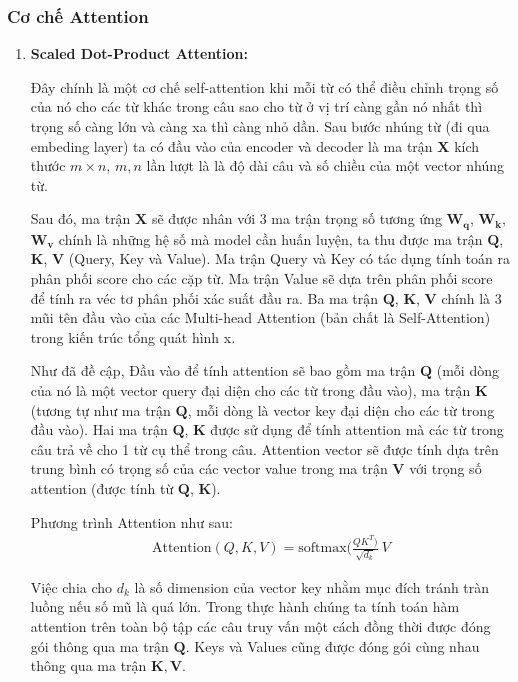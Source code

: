 \subsubsection{Cơ chế Attention}
\begin{enumerate}
    \item \textbf{Scaled Dot-Product Attention:}

    Đây chính là một cơ chế self-attention khi mỗi từ có thể điều chỉnh trọng số của nó cho các từ khác trong câu sao cho từ ở vị trí càng gần nó nhất thì trọng số càng lớn và càng xa thì càng nhỏ dần. Sau bước nhúng từ (đi qua embeding layer) ta có đầu vào của encoder và decoder là ma trận $\mathbf{X}$ kích thước $m\times n$, $m,n$ lần lượt là là độ dài câu và số chiều của một vector nhúng từ.

    Sau đó, ma trận $\mathbf{X}$ sẽ được nhân với 3 ma trận trọng số tương ứng $\mathbf{W}_\mathbf{q}$, $\mathbf{W}_\mathbf{k}$, $\mathbf{W}_\mathbf{v}$ chính là những hệ số mà model cần huấn luyện, ta thu được ma trận $\mathbf{Q}$, $\mathbf{K}$, $\mathbf{V}$ (Query, Key và Value). Ma trận Query và Key có tác dụng tính toán ra phân phối score cho các cặp từ. Ma trận Value sẽ dựa trên phân phối score để tính ra véc tơ phân phối xác suất đầu ra. Ba ma trận $\mathbf{Q}$, $\mathbf{K}$, $\mathbf{V}$ chính là 3 mũi tên đầu vào của các Multi-head Attention (bản chất là Self-Attention) trong kiến trúc tổng quát hình x.

    Như đã đề cập, Đầu vào để tính attention sẽ bao gồm ma trận $\mathbf{Q}$ (mỗi dòng của nó là một vector query đại diện cho các từ trong đầu vào), ma trận $\mathbf{K}$ (tương tự như ma trận $\mathbf{Q}$, mỗi dòng là vector key đại diện cho các từ trong đầu vào). Hai ma trận $\mathbf{Q}$, $\mathbf{K}$ được sử dụng để tính attention mà các từ trong câu trả về cho 1 từ cụ thể trong câu. Attention vector sẽ được tính dựa trên trung bình có trọng số của các vector value trong ma trận $\mathbf{V}$ với trọng số attention (được tính từ $\mathbf{Q}$, $\mathbf{K}$).

    Phương trình Attention như sau:
    \begin{align}
        \mathrm{Attention}({Q, K, V}) = \mathrm{softmax}(\frac{{QK^T})}{\sqrt{d_k}}\ {V} \tag{xxx}
    \end{align}

    Việc chia cho $d_k$ là số dimension của vector key nhằm mục đích tránh tràn luồng nếu số mũ là quá lớn.
    Trong thực hành chúng ta tính toán hàm attention trên toàn bộ tập các câu truy vấn một cách đồng thời được đóng gói thông qua ma trận $\mathbf{Q}$. Keys và Values cũng được đóng gói cùng nhau thông qua ma trận $\mathbf{K},\mathbf{V}$.


\end{enumerate}
